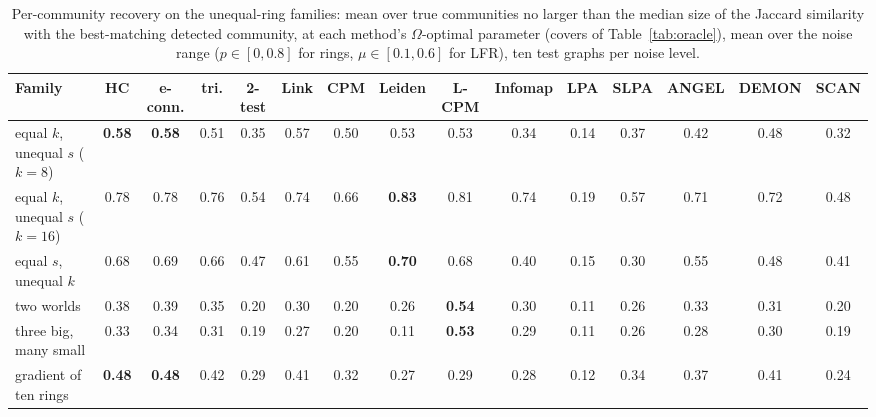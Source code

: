 \begin{table}[t]
\caption{Per-community recovery on the unequal-ring families: mean over true communities no larger than the median size of the Jaccard similarity with the best-matching detected community, at each method's $\Omega$-optimal parameter (covers of Table~\ref{tab:oracle}), mean over the noise range ($p\in[0,0.8]$ for rings, $\mu\in[0.1,0.6]$ for LFR), ten test graphs per noise level.}
\label{tab:recsmall}
\scriptsize\setlength{\tabcolsep}{2pt}
\begin{ruledtabular}
\begin{tabular}{lcccccccccccccc}
Family & HC & e-conn. & tri. & 2-test & Link & CPM & Leiden & L-CPM & Infomap & LPA & SLPA & ANGEL & DEMON & SCAN \\
\hline
equal $k$, unequal $s$ ($k{=}8$) & \textbf{0.58} & \textbf{0.58} & 0.51 & 0.35 & 0.57 & 0.50 & 0.53 & 0.53 & 0.34 & 0.14 & 0.37 & 0.42 & 0.48 & 0.32 \\
equal $k$, unequal $s$ ($k{=}16$) & 0.78 & 0.78 & 0.76 & 0.54 & 0.74 & 0.66 & \textbf{0.83} & 0.81 & 0.74 & 0.19 & 0.57 & 0.71 & 0.72 & 0.48 \\
equal $s$, unequal $k$ & 0.68 & 0.69 & 0.66 & 0.47 & 0.61 & 0.55 & \textbf{0.70} & 0.68 & 0.40 & 0.15 & 0.30 & 0.55 & 0.48 & 0.41 \\
two worlds & 0.38 & 0.39 & 0.35 & 0.20 & 0.30 & 0.20 & 0.26 & \textbf{0.54} & 0.30 & 0.11 & 0.26 & 0.33 & 0.31 & 0.20 \\
three big, many small & 0.33 & 0.34 & 0.31 & 0.19 & 0.27 & 0.20 & 0.11 & \textbf{0.53} & 0.29 & 0.11 & 0.26 & 0.28 & 0.30 & 0.19 \\
gradient of ten rings & \textbf{0.48} & \textbf{0.48} & 0.42 & 0.29 & 0.41 & 0.32 & 0.27 & 0.29 & 0.28 & 0.12 & 0.34 & 0.37 & 0.41 & 0.24 \\
\end{tabular}
\end{ruledtabular}
\end{table}

